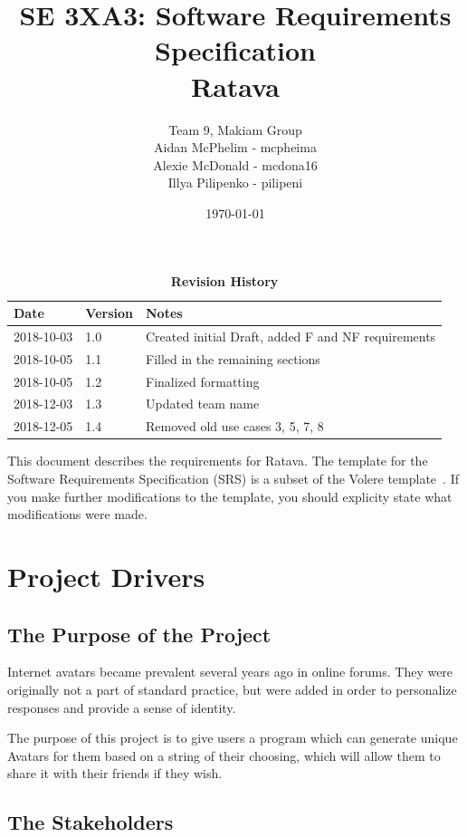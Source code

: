 \documentclass[12pt, titlepage]{article}
\title{SE 3XA3: Software Requirements Specification\\Ratava}
\author{Team 9, Makiam Group
		\\ Aidan McPhelim - mcpheima
		\\ Alexie McDonald - mcdona16
		\\ Illya Pilipenko - pilipeni
}
\date{\today}
\begin{document}
\maketitle

\tableofcontents
\listoftables
\listoffigures

\begin{table}[bp]
\caption{\bf Revision History}
\begin{tabularx}{\textwidth}{p{3cm}p{2cm}X}
\toprule {\bf Date} & {\bf Version} & {\bf Notes}\\
\midrule
2018-10-03 & 1.0 & Created initial Draft, added F and NF requirements\\
2018-10-05 & 1.1 & Filled in the remaining sections\\
2018-10-05 & 1.2 & Finalized formatting\\
2018-12-03 & 1.3 & Updated team name\\
2018-12-05 & 1.4 & Removed old use cases 3, 5, 7, 8\\
\bottomrule
\end{tabularx}
\end{table}

\newpage


This document describes the requirements for Ratava.  The template for the Software
Requirements Specification (SRS) is a subset of the Volere
template~\citep{RobertsonAndRobertson2012}.  If you make further modifications
to the template, you should explicity state what modifications were made.

\section{Project Drivers}

\subsection{The Purpose of the Project}
Internet avatars became prevalent several years ago in online forums. They were originally not a part of standard practice, but were added in order to personalize responses and provide a sense of identity.

The purpose of this project is to give users a program which can generate unique Avatars for them based on a string of their choosing, which will allow them to share it with their friends if they wish.


\subsection{The Stakeholders}
\end{document}
